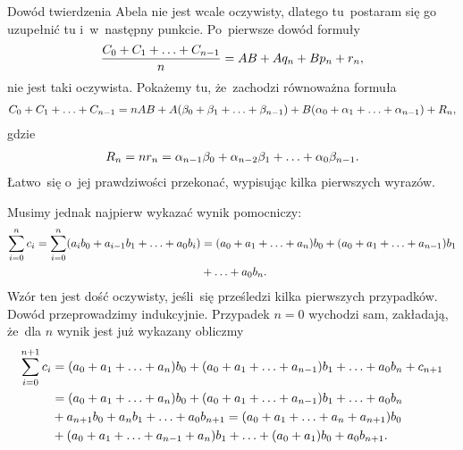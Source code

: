 \documentclass[a4paper,11pt]{article}
\begin{document}
\vspace{\spaceFour}


\start {} Dowód twierdzenia Abela nie jest wcale oczywisty,
dlatego tu~postaram się go uzupełnić tu i~w~następny punkcie.
Po~pierwsze dowód formuły
\begin{equation}
  \label{eq:Leja-17}
  \begin{split}
    \frac{ C_{ 0 } + C_{ 1 } + \ldots + C_{ n - 1 } }{ n } = AB + A q_{ n }
    + B p_{ n } + r_{ n },
  \end{split}
\end{equation}
nie jest taki oczywista. Pokażemy tu, że~zachodzi równoważna formuła
\begin{equation}
  \label{eq:Leja-18}
  \begin{split}
    C_{ 0 } + C_{ 1 } + \ldots + C_{ n - 1 } = n AB + A ( \beta_{ 0 } +
    \beta_{ 1 } + \ldots + \beta_{ n - 1 } ) + B ( \alpha_{ 0 } + \alpha_{ 1 } +
    \ldots + \alpha_{ n - 1 } ) + R_{ n },
  \end{split}
\end{equation}
gdzie
\begin{equation}
  \label{eq:Leja-19}
  \begin{split}
    R_{ n } = n r_{ n } = \alpha_{ n - 1 } \beta_{ 0 } + \alpha_{ n - 2 }
    \beta_{ 1 } + \ldots + \alpha_{ 0 } \beta_{ n - 1 }.
  \end{split}
\end{equation}
Łatwo~się o~jej prawdziwości przekonać, wypisując kilka pierwszych
wyrazów.

Musimy jednak najpierw wykazać wynik pomocniczy:
\begin{equation}
  \label{eq:Leja-20}
  \begin{split}
    \sum\limits_{ i = 0 }^{ n } c_{ i } = \sum\limits_{ i = 0 }^{ n } ( a_{ i } b_{
      0 } + a_{ i - 1 } b_{ 1 } + \ldots + a_{ 0 } b_{ i } ) &= ( a_{ 0 }
    + a_{ 1 } + \ldots + a_{ n } ) b_{ 0 } + ( a_{ 0 } + a_{ 1 }
    + \ldots + a_{ n - 1 } ) b_{ 1 } \\
    &+ \ldots + a_{ 0 } b_{ n }.
  \end{split}
\end{equation}
Wzór ten jest dość oczywisty, jeśli~się prześledzi kilka pierwszych
przypadków. Dowód przeprowadzimy indukcyjnie. Przypadek $n = 0$
wychodzi sam, zakładają, że~dla $n$ wynik jest już wykazany obliczmy
\begin{equation}
  \label{eq:Leja-21}
  \begin{split}
    \sum\limits_{ i = 0 }^{ n + 1 } c_{ i } &= ( a_{ 0 } + a_{ 1 } + \ldots +
    a_{ n } ) b_{ 0 } + ( a_{ 0 } + a_{ 1 } + \ldots + a_{ n - 1 } ) b_{
      1 } + \ldots
    + a_{ 0 } b_{ n } + c_{ n + 1 } \\
    &= ( a_{ 0 } + a_{ 1 } + \ldots + a_{ n } ) b_{ 0 } + ( a_{ 0 } + a_{
      1 }
    + \ldots + a_{ n - 1 } ) b_{ 1 } + \ldots + a_{ 0 } b_{ n } \\
    &+ a_{ n + 1 } b_{ 0 } + a_{ n } b_{ 1 } + \ldots + a_{ 0 } b_{ n + 1
    }
    = ( a_{ 0 } + a_{ 1 } + \ldots + a_{ n } + a_{ n + 1 } ) b_{ 0 } \\
    &+ ( a_{ 0 } + a_{ 1 } + \ldots + a_{ n - 1 } + a_{ n } ) b_{ 1 } +
    \ldots + ( a_{ 0 } + a_{ 1 } ) b_{ 0 } + a_{ 0 } b_{ n + 1 }.
  \end{split}
\end{equation}
\end{document}
